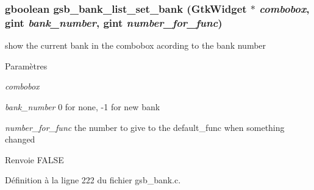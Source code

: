 \subsubsection[{gsb\_\-bank\_\-list\_\-set\_\-bank}]{\setlength{\rightskip}{0pt plus 5cm}gboolean gsb\_\-bank\_\-list\_\-set\_\-bank (GtkWidget $\ast$ {\em combobox}, \/  gint {\em bank\_\-number}, \/  gint {\em number\_\-for\_\-func})}\label{gsb__bank_8h_a3733eb484b3e08e5f313fd7d45bdc1d9}
show the current bank in the combobox acording to the bank number


\begin{DoxyParams}{Paramètres}
\item[{\em combobox}]\item[{\em bank\_\-number}]0 for none, -\/1 for new bank \item[{\em number\_\-for\_\-func}]the number to give to the default\_\-func when something changed\end{DoxyParams}
\begin{DoxyReturn}{Renvoie}
FALSE 
\end{DoxyReturn}


Définition à la ligne 222 du fichier gsb\_\-bank.c.

